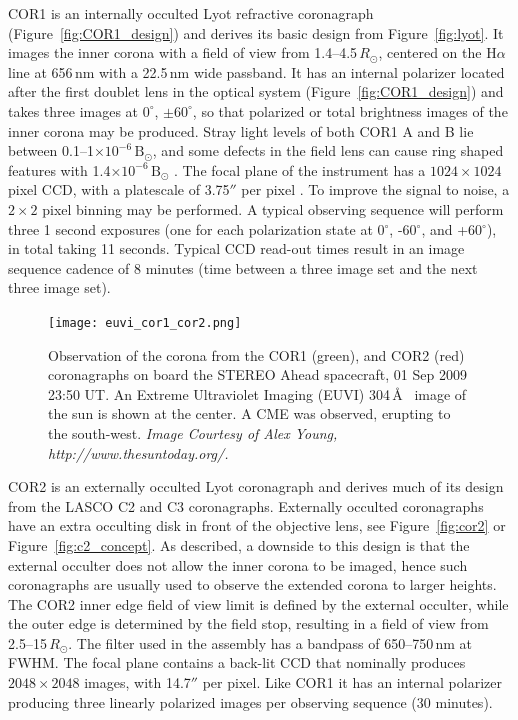 COR1 is an internally occulted Lyot refractive coronagraph (Figure~\ref{fig:COR1_design}) and derives its basic design from Figure~\ref{fig:lyot}. It images the inner corona with a field of view from 1.4--4.5\,$R_{\odot}$, centered on the H$\alpha$ line at 656\,nm with a 22.5\,nm wide passband. 
It has an internal polarizer located after the first doublet lens in the optical system (Figure~\ref{fig:COR1_design}) and takes three images at $0^{\circ}$, $\pm60^{\circ}$, so that polarized or total brightness images of the inner corona may be produced. Stray light levels of both COR1 A and B lie between 0.1--1$\times10^{-6}\,\mathrm{B}_{\odot}$, and some defects in the field lens can cause ring shaped features with 1.4$\times10^{-6}\,\mathrm{B}_{\odot}$ \citep{how08}. The focal plane of the instrument has a $1024\times1024$ pixel CCD, with a platescale of 3.75$''$ per pixel \citep{thomp2008}. To improve the signal to noise, a $2\times2$ pixel binning may be performed. A typical observing sequence will perform three 1 second exposures (one for each polarization state at 0$^{\circ}$, -60$^{\circ}$, and +60$^{\circ}$), in total taking 11 seconds. Typical CCD read-out times result in an image sequence cadence of 8 minutes (time between a three image set and the next three image set).
\begin{figure}[!t]
\begin{center}
\texttt{[image: euvi\_cor1\_cor2.png]}
\caption[COR1 and COR2 observations]{Observation of the corona from the COR1 (green), and COR2 (red) coronagraphs on board the STEREO Ahead spacecraft, 01 Sep 2009 23:50 UT. An Extreme Ultraviolet Imaging (EUVI) 304\,\AA~ image of the sun is shown at the center. A CME was observed, erupting to the south-west. {\it Image Courtesy of Alex Young, http://www.thesuntoday.org/.} }
\label{fig:cor1cor2}
\end{center}
\end{figure}

COR2 is an externally occulted Lyot coronagraph and derives much of its design from the LASCO C2 and C3 coronagraphs. Externally occulted coronagraphs have an extra occulting disk in front of the objective lens, see Figure~\ref{fig:cor2} or Figure~\ref{fig:c2_concept}. As described, a downside to this design is that the external occulter does not allow the inner corona to be imaged, hence such coronagraphs are usually used to observe the extended corona to larger heights. The COR2 inner edge field of view limit is defined by the external occulter, while the outer edge is determined by the field stop, resulting in a field of view from 2.5--15$\,R_{\odot}$. The filter used in the assembly has a bandpass of 650--750\,nm at FWHM. The focal plane contains a back-lit CCD that nominally produces $2048\times2048$ images, with 14.7$''$ per pixel. Like COR1 it has an internal polarizer producing three linearly polarized images per observing sequence (30 minutes).

